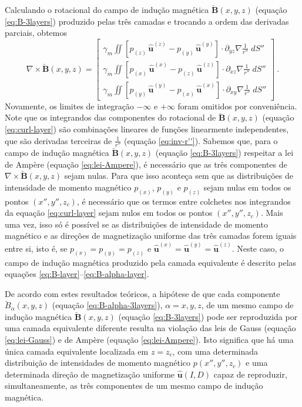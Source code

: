 Calculando o rotacional do campo de indução magnética 
$\breve{\mathbf{B}}(x, y, z)$ (equação \ref{eq:B-3layers}) produzido pelas três camadas 
e trocando a ordem das derivadas parciais, obtemos
\begin{equation}
\nabla \times \breve{\mathbf{B}}(x, y, z) = \begin{bmatrix}
\gamma_{m} \iint
\left[ p_{(z)} \, \hat{\mathbf{u}}^{(z)} - p_{(y)} \, \hat{\mathbf{u}}^{(y)} \right] \cdot 
\partial_{yz} \nabla \frac{1}{r''} \; dS'' \\
\gamma_{m} \iint
\left[ p_{(x)} \, \hat{\mathbf{u}}^{(x)} - p_{(z)} \, \hat{\mathbf{u}}^{(z)} \right] \cdot 
\partial_{xz} \nabla \frac{1}{r''} \; dS'' \\
\gamma_{m} \iint
\left[ p_{(y)} \, \hat{\mathbf{u}}^{(y)} - p_{(x)} \, \hat{\mathbf{u}}^{(x)} \right] \cdot 
\partial_{xy} \nabla \frac{1}{r''} \; dS''
\end{bmatrix} \: .
\label{eq:curl-layer}
\end{equation}
Novamente, os limites de integração $-\infty$ e $+\infty$ foram omitidos por conveniência.
Note que os integrandos das componentes do rotacional de $\breve{\mathbf{B}}(x, y, z)$ 
(equação \ref{eq:curl-layer}) são combinações lineares de funções linearmente 
independentes, que são derivadas terceiras de $\frac{1}{r''}$ (equação \ref{eq:inv-r''}).
Sabemos que, para o campo de indução magnética $\breve{\mathbf{B}}(x, y, z)$ 
(equação \ref{eq:B-3layers}) respeitar a lei de Ampère (equação \ref{eq:lei-Ampere}), é necessário que as 
três componentes de $\nabla \times \breve{\mathbf{B}}(x, y, z)$ sejam nulas. 
Para que isso aconteça sem que as distribuições de intensidade de momento magnético 
$p_{(x)}$, $p_{(y)}$ e $p_{(z)}$ sejam 
nulas em todos os pontos $(x'', y'', z_{c})$, é necessário que os termos entre colchetes
nos integrandos da equação \ref{eq:curl-layer} sejam nulos em todos os pontos $(x'', y'', z_{c})$.
Mais uma vez, isso só é possível se as distribuições de intensidade de momento magnético 
e as direções de magnetização uniforme das três camadas forem iguais entre si, isto é, se 
$p_{(x)} = p_{(y)} = p_{(z)}$ e 
$\hat{\mathbf{u}}^{(x)} = \hat{\mathbf{u}}^{(y)} = \hat{\mathbf{u}}^{(z)}$.
Neste caso, o campo de indução magnética produzido pela camada equivalente é descrito pelas equações 
\ref{eq:B-layer}--\ref{eq:B-alpha-layer}.

De acordo com estes resultados teóricos, a hipótese de que cada componente $\breve{B}_{\alpha}(x, y, z)$ 
(equação \ref{eq:B-alpha-3layers}), $\alpha = x, y, z$, de um mesmo campo de indução magnética $\breve{\mathbf{B}}(x, y, z)$ 
(equação \ref{eq:B-3layers}) pode ser reproduzida por uma camada equivalente diferente resulta na 
violação das leis de Gauss (equação \ref{eq:lei-Gauss}) e de Ampère (equação \ref{eq:lei-Ampere}).
Isto significa que há uma única camada equivalente localizada em $z = z_{c}$, 
com uma determinada distribuição de intensidades de momento magnético $p(x'', y'', z_{c})$ e uma 
determinada direção de magnetização uniforme $\hat{\mathbf{u}}(I, D)$ capaz de reproduzir, simultaneamente,
as três componentes de um mesmo campo de indução magnética.

